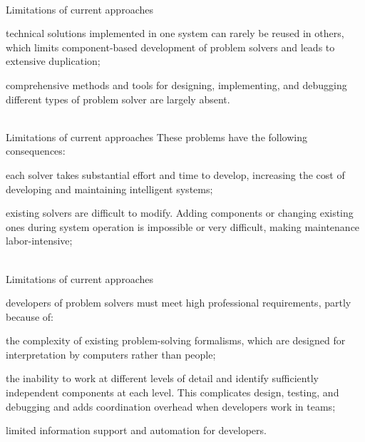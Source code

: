 \begin{frame}{\\Limitations of current approaches}
	\topline
	\justifying
	\begin{textitemize}
		\item technical solutions implemented in one system can rarely be reused in others, which limits component-based development of problem solvers and leads to extensive duplication;
		\item comprehensive methods and tools for designing, implementing, and debugging different types of problem solver are largely absent.
	\end{textitemize}
\end{frame}

\begin{frame}{\\Limitations of current approaches}
	\topline
	\justifying
	These problems have the following consequences:
	\begin{textitemize}
		\item each solver takes substantial effort and time to develop, increasing the cost of developing and maintaining intelligent systems;
		\item existing solvers are difficult to modify. Adding components or changing existing ones during system operation is impossible or very difficult, making maintenance labor-intensive;
	\end{textitemize}
\end{frame}

\begin{frame}{\\Limitations of current approaches}
	\topline
	\justifying
	\vspace*{\fill}\\
	\begin{textitemize}
		\item developers of problem solvers must meet high professional requirements, partly because of:
		\begin{textitemize}
			\item the complexity of existing problem-solving formalisms, which are designed for interpretation by computers rather than people;
			\item the inability to work at different levels of detail and identify sufficiently independent components at each level. This complicates design, testing, and debugging and adds coordination overhead when developers work in teams;
			\item limited information support and automation for developers.
		\end{textitemize}
	\end{textitemize}
\end{frame}

